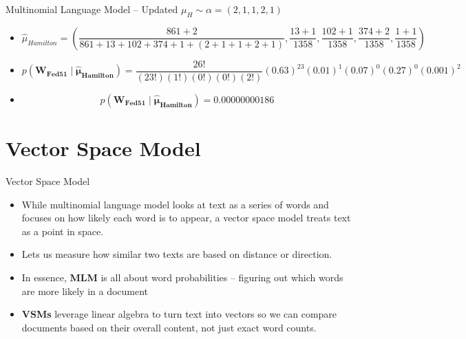 \documentclass[
  ignorenonframetext,
  aspectratio=169]{beamer}
\begin{document}
\begin{frame}{Multinomial Language Model -- Updated
\(\mu_{H} \sim \alpha = (2,1,1,2,1)\)}
\label{multinomial-language-model-updated-mu_h-sim-alpha-21121}
\begin{itemize} 
\item[] \footnotesize{$$ \hat{\mu}_{Hamilton} = (\frac{861 + 2}{861+13+102+374+1 + (2 + 1 + 1 + 2 + 1)}, \frac{13+1}{1358}, \frac{102+1}{1358}, \frac{374+2}{1358}, \frac{1+1}{1358})$$}
\item[] $$p(\mathbf{W_{Fed51}\mid\hat{\mu}_{Hamilton}}) = \frac{26!}{(23!)(1!)(0!)(0!)(2!)}(0.63)^{23}(0.01)^{1}(0.07)^{0}(0.27)^{0}(0.001)^{2}$$
\item[] $$ p(\mathbf{W_{Fed51}\mid\hat{\mu}_{Hamilton}}) = 0.00000000186 $$
\end{itemize}
\end{frame}

\section{Vector Space Model}\label{vector-space-model}

\begin{frame}{Vector Space Model}
\label{vector-space-model-1}
\begin{itemize}
\item While multinomial language model looks at text as a series of words and focuses on how likely each word is to appear, a vector space model treats text as a point in space. \par \vspace{2.5mm}
\item Lets us measure how similar two texts are based on distance or direction.  \par \vspace{2.5mm}
\item In essence, \textbf{MLM} is all about word probabilities –  figuring out which words are more likely in a document \par \vspace{2.5mm}
\item \textbf{VSMs} leverage linear algebra to turn text into vectors so we can compare documents based on their overall content, not just exact word counts.
\end{itemize}
\end{frame}
\end{document}
